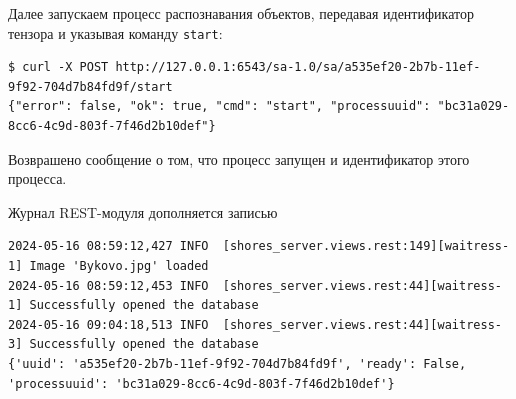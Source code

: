 \documentclass[732,14pt,final]{studrep}
\begin{document}
Далее запускаем процесс распознавания объектов, передавая идентификатор тензора и указывая команду \verb|start|:
\begin{verbatim}
$ curl -X POST http://127.0.0.1:6543/sa-1.0/sa/a535ef20-2b7b-11ef-9f92-704d7b84fd9f/start
{"error": false, "ok": true, "cmd": "start", "processuuid": "bc31a029-8cc6-4c9d-803f-7f46d2b10def"}
\end{verbatim}
Возврашено сообщение о том, что процесс запущен и идентификатор этого процесса.

Журнал REST-модуля дополняется записью
\begin{verbatim}
2024-05-16 08:59:12,427 INFO  [shores_server.views.rest:149][waitress-1] Image 'Bykovo.jpg' loaded
2024-05-16 08:59:12,453 INFO  [shores_server.views.rest:44][waitress-1] Successfully opened the database
2024-05-16 09:04:18,513 INFO  [shores_server.views.rest:44][waitress-3] Successfully opened the database
{'uuid': 'a535ef20-2b7b-11ef-9f92-704d7b84fd9f', 'ready': False, 'processuuid': 'bc31a029-8cc6-4c9d-803f-7f46d2b10def'}
\end{verbatim}
  
\end{document}
